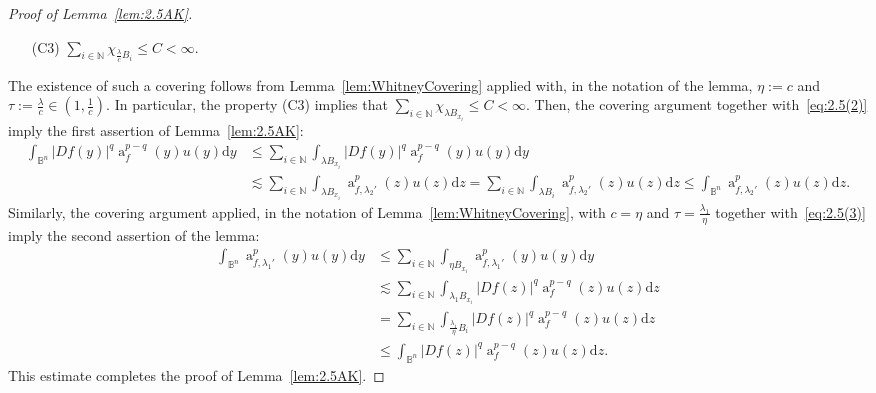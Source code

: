 \documentclass[11pt,a4paper,reqno]{amsart}
\theoremstyle{definition}
\renewcommand{\a}{\operatorname{a}}
\newcommand{\B}{\mathbb{B}^n}
\newcommand{\N}{\mathbb{N}}
\newcommand{\ud}{\mathrm {d}}
\numberwithin{komcounter}{section}
\begin{document}
\begin{proof}[Proof of Lemma~\ref{lem:2.5AK}]
\begin{itemize}
\item[(C3)] $\underset{i\in\N}{\sum}\chi_{\frac{\lambda}{c} B_i}\leq C<\infty$.
	\end{itemize}
The existence of such a covering follows from Lemma~\ref{lem:WhitneyCovering} applied with, in the notation of the lemma, $\eta:=c$ and $\tau:=\frac{\lambda}{c}\in (1,\frac{1}{c})$. In particular, the property (C3) implies that	
$\underset{i\in\N}{\sum}\chi_{\lambda B_{x_i}}\leq C<\infty$.
Then, the covering argument  together with~\eqref{eq:2.5(2)} imply the first assertion of Lemma~\ref{lem:2.5AK}:
\begin{align*}
\int_{\B}|Df(y)|^q\a_f^{p-q}(y)u(y)\ud y &\leq \sum_{i\in\N}\int_{\lambda B_{x_i}}|Df(y)|^q\a_f^{p-q}(y)u(y)\ud y\\
&\lesssim \sum_{i\in\N}\int_{\lambda B_{x_i}}\a_{f, \lambda_2'}^{p}(z)u(z)\ud z= \sum_{i\in\N}\int_{\lambda B_{i}}\a_{f, \lambda_2'}^{p}(z)u(z)\ud z\leq  \int_{\B}\a_{f, \lambda_2'}^{p}(z)u(z)\ud z.
\end{align*}
Similarly, the covering argument applied, in the notation of  Lemma~\ref{lem:WhitneyCovering}, with $c=\eta$ and $\tau=\frac{\lambda_1}{\eta}$ together with~\eqref{eq:2.5(3)} imply the second assertion of the lemma:
\begin{align*}
\int_{\B}\a_{f,\lambda_1'}^{p}(y)u(y)\ud y &\leq \sum_{i\in\N}\int_{\eta B_{x_i}}\a_{f,\lambda_1'
}^{p}(y)u(y)\ud y \\
&\lesssim \sum_{i\in\N}\int_{\lambda_1B_{x_i}}|Df(z)|^q\a_{f}^{p-q}(z)u(z)\ud z \\
& = \sum_{i\in\N}\int_{\frac{\lambda_1}{\eta} B_{i}}|Df(z)|^q\a_{f}^{p-q}(z)u(z)\ud z \\
&\leq \int_{\B}|Df(z)|^q\a_{f}^{p-q}(z)u(z)\ud z.
\end{align*}
This estimate completes the proof of Lemma~\ref{lem:2.5AK}.

\end{proof}
\end{document}
